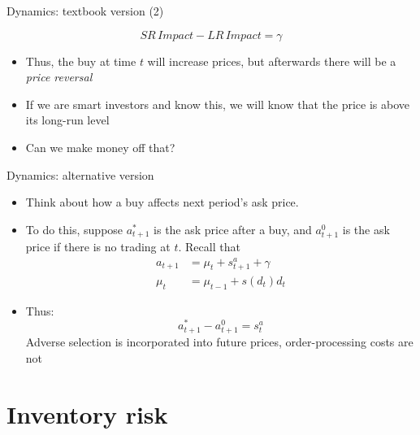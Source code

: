 \documentclass[english,10pt]{beamer}
\begin{document}
\begin{frame}{Dynamics: textbook version (2)}
	\begin{block}{}
		\[
		SR \, Impact - LR \, Impact = \gamma
		\]
	\end{block}
	\begin{itemize}
		\item Thus, the buy at time $t$ will increase prices, but afterwards there will be a \textit{price reversal}
		\item If we are smart investors and know this, we will know that the price is above its long-run level
		\item Can we make money off that? \pause {}
	\end{itemize}
\end{frame}


\begin{frame}{Dynamics: alternative version}
	\begin{itemize}
		\item Think about how a buy affects next period's ask price. 
		\item To do this, suppose $a^*_{t+1}$ is the ask price after a buy, and $a^0_{t+1}$ is the ask price if there is no trading at $t$. Recall that 
		\begin{align*}
		a_{t+1} & = \mu_t + s^a_{t+1} + \gamma \\
		\mu_t & = \mu_{t-1} + s(d_t) d_t
		\end{align*}
		\item Thus:
		\[
		a^*_{t+1} - a^0_{t+1} = s^a_{t}
		\]
		Adverse selection is incorporated into future prices, order-processing costs are not
	\end{itemize}
\end{frame}



\section{Inventory risk}
\end{document}
